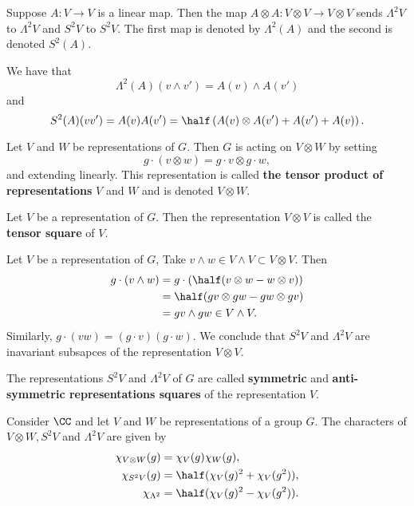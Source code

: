 \documentclass[12pt, a4paper]{article}
\begin{document}
\begin{definition}
    Suppose \(A : V \to V\) is a linear map. Then the map \(A \otimes A : V \otimes V \to V \otimes V\) sends \(\Lambda^2V\) to \(\Lambda^2V\) and \(S^2V\) to \(S^2V\). The first map is denoted by \(\Lambda^2(A)\) and the second is denoted \(S^2(A)\).
\end{definition}

\begin{mdprop}
    We have that 
    \[\Lambda^2(A)(v\wedge v')=A(v)\wedge A(v')\]
    and 
    \[S^2(A)(vv')=A(v)A(v')=\half \left( A(v)\otimes A(v')+A(v')+A(v) \right).\]
\end{mdprop}

\begin{definition}
    Let \(V\) and \(W\) be representations of \(G\). Then \(G\) is acting on \(V \otimes W\) by setting 
    \[g\cdot (v\otimes w)=g\cdot v\otimes g\cdot w,\]
    and extending linearly. This representation is called \textbf{the tensor product of representations} \(V\) and \(W\) and is denoted \(V \otimes W\). 
\end{definition}

\begin{definition}
    Let \(V\) be a representation of \(G\). Then the representation \(V \otimes V\) is called the \textbf{tensor square} of \(V\).
\end{definition}

\begin{mdexample}
    Let \(V\) be a representation of \(G\), Take \(v\wedge w \in V\wedge V \subset V\otimes V\). Then 
    \[\begin{aligned}
        g\cdot (v\wedge w) &= g\cdot \left( \half (v\otimes w-w\otimes v) \right)\\
        &= \half(gv\otimes gw -gw\otimes gv) \\
        &= gv\wedge gw \in V\wedge V.
    \end{aligned}\]
    Similarly, \(g\cdot(vw)=(g\cdot v)(g\cdot w)\). We conclude that \(S^2V\) and \(\Lambda^2V\) are inavariant subsapces of the representation \(V \otimes V\).
\end{mdexample}

\begin{definition}
    The representations \(S^2V\) and \(\Lambda^2 V\) of \(G\) are called \textbf{symmetric} and \textbf{anti-symmetric representations squares} of the representation \(V\).
\end{definition}

\begin{mdprop}
    Consider \(\CC\) and let \(V\) and \(W\) be representations of a group \(G\). The characters of \(V \otimes W , S^2 V\) and \(\Lambda^2 V\) are given by 
    \[\begin{aligned}
        \chi_{V \otimes W}(g) &= \chi_V(g)\chi_W(g), \\
        \chi_{S^2V}(g) &= \half (\chi_V(g)^2 +\chi_V(g^2)),\\
        \chi_{\Lambda^2} &= \half (\chi_V(g)^2-\chi_V(g^2)).
    \end{aligned}\]
\end{mdprop}
\end{document}

